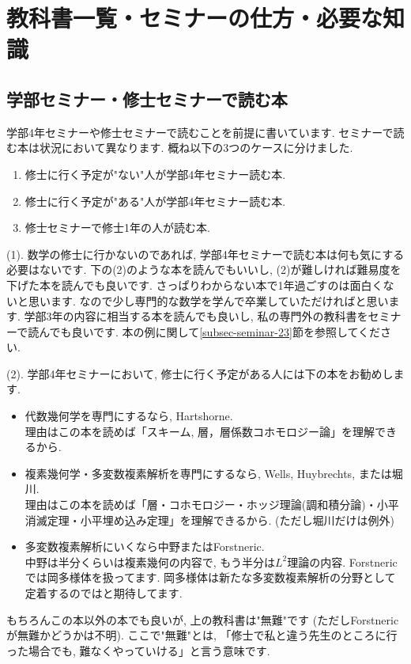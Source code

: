 
\section{教科書一覧・セミナーの仕方・必要な知識}
\label{sec-2}

\subsection{学部セミナー・修士セミナーで読む本}
学部4年セミナーや修士セミナーで読むことを前提に書いています.
セミナーで読む本は状況において異なります. 概ね以下の3つのケースに分けました. 
\begin{enumerate}[label=$(\arabic*)$]
  \setlength{\parskip}{0cm} %
  \setlength{\itemsep}{0cm} %
 \item 修士に行く予定が"ない"人が学部4年セミナー読む本.
\item 修士に行く予定が"ある"人が学部4年セミナー読む本.
\item 修士セミナーで修士1年の人が読む本.
\end{enumerate}

(1). 数学の修士に行かないのであれば, 学部4年セミナーで読む本は何も気にする必要はないです. 
下の(2)のような本を読んでもいいし,  (2)が難しければ難易度を下げた本を読んでも良いです. 
さっぱりわからない本で1年過ごすのは面白くないと思います. なので少し専門的な数学を学んで卒業していただければと思います. 
学部3年の内容に相当する本を読んでも良いし, 私の専門外の教科書をセミナーで読んでも良いです. 本の例に関して\ref{subsec-seminar-23}節を参照してください. 

(2). 学部4年セミナーにおいて, 修士に行く予定がある人には下の本をお勧めします.

\begin{tcolorbox}[mybox]
\begin{itemize}[left=0pt]
  \setlength{\parskip}{0cm} %
  \setlength{\itemsep}{8pt} %
\item 代数幾何学を専門にするなら, Hartshorne. \\
理由はこの本を読めば「スキーム, 層，層係数コホモロジー論」を理解できるから.
\item 複素幾何学・多変数複素解析を専門にするなら, Wells, Huybrechts, または堀川. \\ 
理由はこの本を読めば「層・コホモロジー・ホッジ理論(調和積分論)・小平消滅定理・小平埋め込み定理」を理解できるから. (ただし堀川だけは例外)
\item 多変数複素解析にいくなら中野またはForstneric. \\
中野は半分くらいは複素幾何の内容で, もう半分は$L^2$理論の内容. 
Forstnericでは岡多様体を扱ってます. 岡多様体は新たな多変数複素解析の分野として定着するのではと期待してます. 
\end{itemize}
\end{tcolorbox}
もちろんこの本以外の本でも良いが, 上の教科書は"無難"です (ただしForstnericが無難かどうかは不明).
ここで"無難"とは, 「修士で私と違う先生のところに行った場合でも, 難なくやっていける」と言う意味です. 

